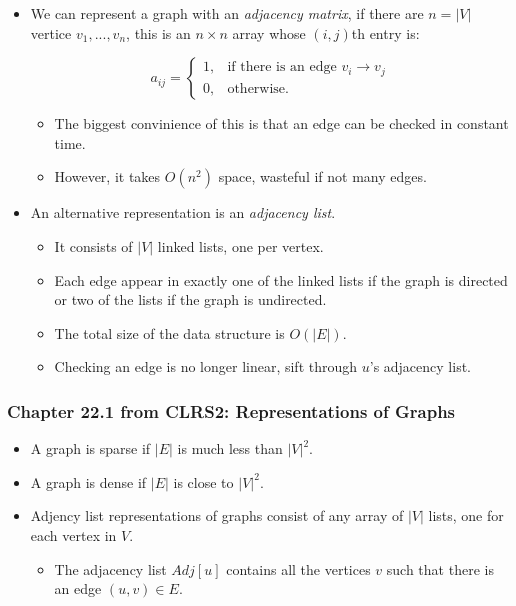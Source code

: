 \documentclass[a4paper,11pt]{article}
\begin{document}
\begin{itemize}
\item
  We can represent a graph with an \emph{adjacency matrix}, if there are
  $n = |V|$ vertice $v_1, ..., v_n$, this is an $n \times n$ array whose
  $(i, j)$th entry is:

  \[a_{ij} = \begin{cases} 1, & \text{if there is an edge } v_i \to v_j \\ 0, & \text{otherwise}. \end{cases}\]

  \begin{itemize}
  \itemsep1pt\parskip0pt
  \item
    The biggest convinience of this is that an edge can be checked in
    constant time.
  \item
    However, it takes $O(n^2)$ space, wasteful if not many edges.
  \end{itemize}
\item
  An alternative representation is an \emph{adjacency list}.

  \begin{itemize}
  \itemsep1pt\parskip0pt
  \item
    It consists of $|V|$ linked lists, one per vertex.
  \item
    Each edge appear in exactly one of the linked lists if the graph is
    directed or two of the lists if the graph is undirected.
  \item
    The total size of the data structure is $O(|E|)$.
  \item
    Checking an edge is no longer linear, sift through $u$'s adjacency
    list.
  \end{itemize}
\end{itemize}

\subsubsection{Chapter 22.1 from CLRS2: Representations of
Graphs}\label{chapter-22.1-from-clrs2-representations-of-graphs}

\begin{itemize}
\item
  A graph is sparse if $|E|$ is much less than $|V|^2$.
\item
  A graph is dense if $|E|$ is close to $|V|^2$.
\item
  Adjency list representations of graphs consist of any array of $|V|$
  lists, one for each vertex in $V$.

  \begin{itemize}
  \itemsep1pt\parskip0pt
  \item
    The adjacency list $Adj[u]$ contains all the vertices $v$ such that
    there is an edge $(u, v) \in E$.
  \end{itemize}
\end{itemize}
\end{document}
